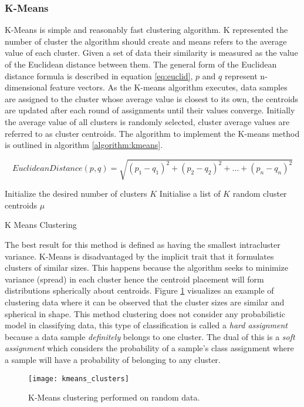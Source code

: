 \subsubsection{K-Means}
\label{subsubsection:kmeans}
K-Means is simple and reasonably fast clustering algorithm. K represented the number of cluster the algorithm should create and means refers to the average value of each cluster. Given a set of data their similarity is measured as the value of the Euclidean distance between them. The general form of the Euclidean distance formula is described in equation \ref{eq:euclid}, $p$ and $q$ represent n-dimensional feature vectors. As the K-means algorithm executes, data samples are assigned to the cluster whose average value is closest to its own, the centroids are updated after each round of assignments until their values converge. Initially the average value of all clusters is randomly selected, cluster average values are referred to as cluster centroids. The algorithm to implement the K-means method is outlined in algorithm \ref{algorithm:kmeans}.

\begin{equation}
    EuclideanDistance(p,q) = \sqrt{(p_1 - q_1)^2 + (p_2 - q_2)^2 +\hdots + (p_n - q_n)^2}
    \label{eq:euclid}
\end{equation} 

\begin{algorithm}
    \SetAlgoLined
    Initialize the desired number of clusters $K$\;
    Initialise a list of $K$ random cluster centroids $\mu$\;
    \caption{K Means Clustering \cite{oreilly_python}}
    \label{algorithm:kmeans}
\end{algorithm}

The best result for this method is defined as having the smallest intracluster variance. K-Means is disadvantaged by the implicit trait that it formulates clusters of similar sizes. This happens because the algorithm seeks to minimize variance (spread) in each cluster hence the  centroid placement will form distributions spherically about centroids. Figure \ref{fig:clusters} visualizes an example of clustering data where it can be observed that the cluster sizes are similar and spherical in shape.  This method clustering does not consider any probabilistic model in classifying data, this type of classification is called a \emph{hard assignment} because a data sample \emph{definitely} belongs to one cluster. The dual of this is a \emph{soft assignment} which considers the probability of a sample's class assignment where a sample will have a probability of belonging to any cluster. 

\begin{figure}[H]
    \centering
    \centering\texttt{[image: kmeans\_clusters]}
    \caption{K-Means clustering performed on random data. \cite{matlab_clustering}}
    \label{fig:clusters}
\end{figure} 